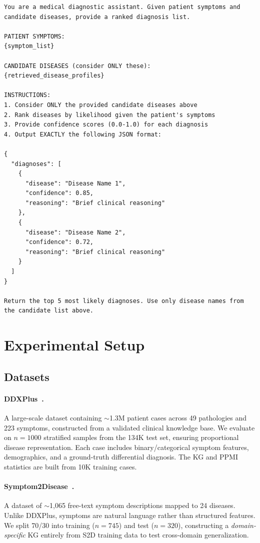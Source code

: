 \documentclass[preprint,12pt]{elsarticle}
\begin{document}
\begin{lstlisting}[basicstyle=\footnotesize\ttfamily, breaklines=true, frame=single]
You are a medical diagnostic assistant. Given patient symptoms and candidate diseases, provide a ranked diagnosis list.

PATIENT SYMPTOMS:
{symptom_list}

CANDIDATE DISEASES (consider ONLY these):
{retrieved_disease_profiles}

INSTRUCTIONS:
1. Consider ONLY the provided candidate diseases above
2. Rank diseases by likelihood given the patient's symptoms
3. Provide confidence scores (0.0-1.0) for each diagnosis
4. Output EXACTLY the following JSON format:

{
  "diagnoses": [
    {
      "disease": "Disease Name 1",
      "confidence": 0.85,
      "reasoning": "Brief clinical reasoning"
    },
    {
      "disease": "Disease Name 2", 
      "confidence": 0.72,
      "reasoning": "Brief clinical reasoning"
    }
  ]
}

Return the top 5 most likely diagnoses. Use only disease names from the candidate list above.
\end{lstlisting}

\section{Experimental Setup}
\label{sec:experiments}

\subsection{Datasets}

\paragraph{DDXPlus~\cite{fansi2022ddxplus}.} A large-scale dataset containing ${\sim}$1.3M patient cases across 49 pathologies and 223 symptoms, constructed from a validated clinical knowledge base. We evaluate on $n{=}1000$ stratified samples from the 134K test set, ensuring proportional disease representation. Each case includes binary/categorical symptom features, demographics, and a ground-truth differential diagnosis. The KG and PPMI statistics are built from 10K training cases.

\paragraph{Symptom2Disease~\cite{gretelai_s2d}.} A dataset of ${\sim}$1,065 free-text symptom descriptions mapped to 24 diseases. Unlike DDXPlus, symptoms are natural language rather than structured features. We split 70/30 into training ($n{=}745$) and test ($n{=}320$), constructing a \emph{domain-specific} KG entirely from S2D training data to test cross-domain generalization.
\end{document}
